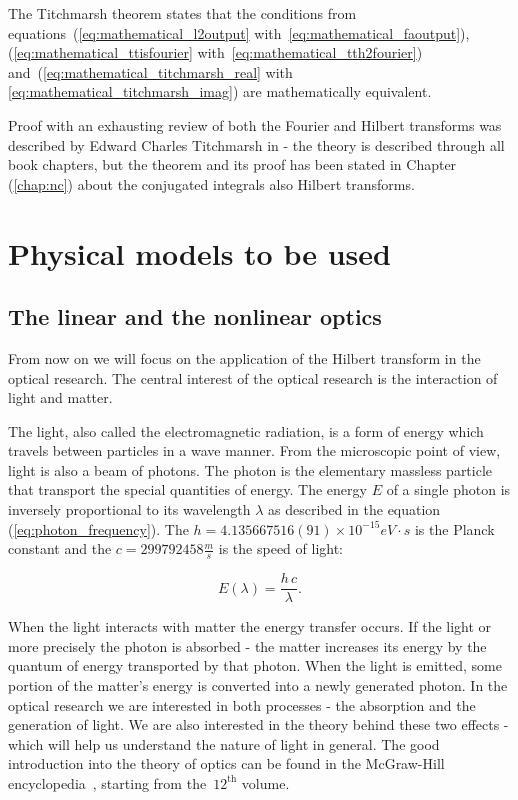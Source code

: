 \documentclass[12pt,twoside,a4paper]{article}
\numberwithin{equation}{subsection}
\numberwithin{figure}{subsection}
\begin{document}
The Titchmarsh theorem states that the conditions from equations~(\ref{eq:mathematical_l2output} with~\ref{eq:mathematical_faoutput}),
(\ref{eq:mathematical_ttisfourier} with~\ref{eq:mathematical_tth2fourier}) and~(\ref{eq:mathematical_titchmarsh_real} with
\ref{eq:mathematical_titchmarsh_imag}) are mathematically equivalent.

Proof with an exhausting review of both the Fourier and Hilbert transforms was described by Edward Charles Titchmarsh in
\cite{titchmarsh_introduction} - the theory is described through all book chapters, but the theorem and its proof has been stated in Chapter
(\ref{chap:nc}) about the conjugated integrals also Hilbert transforms.


\section{Physical models to be used} \label{chap:physical_models}

\subsection{The linear and the nonlinear optics} \label{chap:physical_linearnonlinear}

From now on we will focus on the application of the Hilbert transform in the optical research. The central interest of the optical research
is the interaction of light and matter. 

The light, also called the electromagnetic radiation, is a form of energy which travels between particles in a wave manner. From the
microscopic point of view, light is also a beam of photons. The photon is the elementary massless particle that transport the special
quantities of energy. The energy $E$ of a single photon is inversely proportional to its wavelength $\lambda$ as described in the equation
(\ref{eq:photon_frequency}). The $h = 4.135667516(91) \times 10^{-15} eV \cdot s$ is the Planck constant and the $c = 299792458 \frac{m}{s}$
is the speed of light:

\begin{equation} \label{eq:photon_frequency}
	E(\lambda) = \frac {h\,c} {\lambda}.
\end{equation}

When the light interacts with matter the energy transfer occurs. If the light or more precisely the photon is absorbed - the matter
increases its energy by the quantum of energy transported by that photon. When the light is emitted, some portion of the matter's energy is
converted into a newly generated photon. In the optical research we are interested in both processes - the absorption and the generation of
light. We are also interested in the theory behind these two effects - which will help us understand the nature of light in general. The
good introduction into the theory of optics can be found in the McGraw-Hill encyclopedia~\cite{mcgraw_encyclopedia}, starting from the~$
12^{\text{th}} $ volume.
\end{document}
